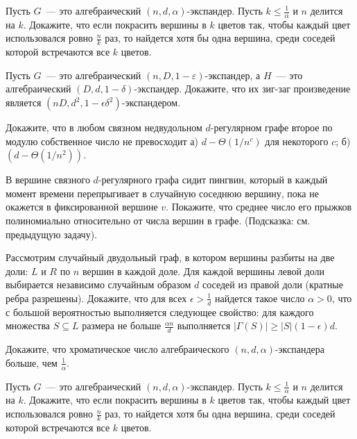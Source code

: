 \setcounter{curtask}{8}



\begin{task}
    Пусть $G$~--- это алгебраический $(n, d, \alpha)$-экспандер. Пусть
    $k \le \frac{1}{\alpha}$ и $n$ делится на $k$. Докажите, что если покрасить
    вершины в $k$ цветов так, чтобы каждый цвет использовался ровно $\frac{n}{k}$
    раз, то найдется хотя бы одна вершина, среди соседей которой встречаются все $k$
    цветов.
\end{task}

\begin{task}
	Пусть $G$~--- это алгебраический $(n,D, 1-\varepsilon)$-экспандер, а $H$~--- это
    алгебраический $(D, d, 1-\delta)$-экспандер. Докажите, что их зиг-заг
    произведение является $(nD, d^2, 1 - \epsilon \delta^2)$-экспандером.
\end{task}

\begin{task}
	Докажите, что в любом связном недвудольном $d$-регулярном графе второе по модулю
	собственное число не превосходит а) $d - \Theta(1 / n^c)$ для некоторого $c$;
	б) $(d - \Theta(1 / n^2))$.
\end{task}

\begin{task}
	В вершине связного $d$-регулярного графа сидит пингвин, который в каждый момент
	времени перепрыгивает в случайную соседнюю вершину, пока не окажется в
    фиксированной вершине $v$. Покажите, что среднее число его прыжков полиномиально
    относительно от числа вершин в графе. (Подсказка: см. предыдущую задачу).
\end{task}

\breakline

\begin{ptask}{5}
    Рассмотрим случайный двудольный граф, в котором вершины разбиты на две доли: $L$
	и $R$ по $n$ вершин в каждой доле. Для каждой вершины левой доли выбирается
	независимо случайным образом $d$ соседей из правой доли (кратные ребра
	разрешены). Докажите, что для всех $\epsilon > \frac{1}{d}$ найдется такое число
	$\alpha>0$, что с большой вероятностью выполняется следующее свойство: для
    каждого множества $S \subseteq L$ размера не больше $\frac{\alpha n}{d}$
    выполняется $|\Gamma(S)| \ge |S|(1 - \epsilon)d$.
\end{ptask}

\begin{ptask}{6}
    Докажите, что хроматическое число алгебраического $(n,d,\alpha)$-экспандера
    больше, чем $\frac{1}{\alpha}$.
\end{ptask}

\begin{ptask}{7}
    Пусть $G$~--- это алгебраический $(n,d,\alpha)$-экспандер. Пусть 
	$k\le \frac{1}{\alpha}$ и $n$ делится на $k$. Докажите, что если покрасить
    вершины  в $k$ цветов так, чтобы каждый цвет использовался ровно $\frac{n}{k}$
	раз, то найдется хотя бы одна вершина, среди соседей которой встречаются все $k$
    цветов.
\end{ptask}